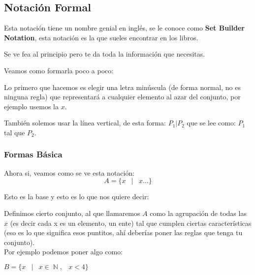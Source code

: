 \documentclass[12pt]{report}                                    %
\DeclareMathOperator \Space {\quad}                             %
\DeclareMathOperator \MiniSpace {\;}                            %
\newcommand \Such {\MiniSpace|\MiniSpace}                       %
\DeclareMathOperator \Naturals {\mathbb{N}}                     %
\begin{document}
                \clearpage
                \subsection{Notación Formal} 

                    Esta notación tiene un nombre genial en inglés, se le conoce como \textbf{Set Builder Notation},
                    esta notación es la que sueles encontrar en los libros. 

                    Se ve fea al principio pero te da toda la información que necesitas.

                    Veamos como formarla poco a poco:

                    Lo primero que hacemos es elegir una letra minúscula (de forma normal, no es ninguna regla)
                    que representará a cualquier elemento al azar del conjunto, por ejemplo usemos la $x$.

                    También solemos usar la línea vertical, de esta forma: $P_1 | P_2$ que se lee como: 
                    $P_1$ tal que $P_2$.  

                    \subsubsection*{Formas Básica}

                        Ahora si, veamos como se ve esta notación:
                        \begin{equation}   
                            A = \{ x \Such x \dots \}
                        \end{equation}

                        Esto es la base y esto es lo que nos quiere decir:

                        Definimos cierto conjunto, al que llamaremos $A$ como la agrupación de todas las $x$
                        (es decir cada x es un elemento, un ente) tal que cumplen ciertas características
                        (eso es lo que significa esos puntitos, ahí deberías poner las reglas que tenga
                        tu conjunto). \\

                        Por ejemplo podemos poner algo como:

                        $B = \{ x \Such x \in \Naturals, \MiniSpace x < 4 \}$\\
\end{document}
